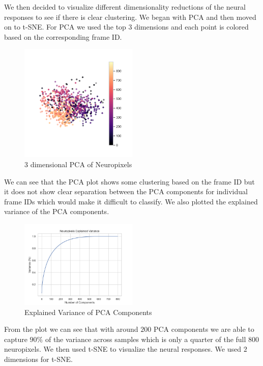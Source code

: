 \documentclass[12pt, letterpaper]{article}
\begin{document}
We then decided to visualize different dimensionality reductions of the neural responses to see if there is clear clustering. We began with PCA and then moved on to t-SNE. For PCA we used the top $3$ dimensions and each point is colored based on the corresponding frame ID. 

\begin{figure}[H]
    \centering
    \includegraphics[width=0.5\textwidth]{3d_pca_neuropixels.png}
    \caption{3 dimensional PCA of Neuropixels}
    \label{fig:3d_pca_neuropixels}
\end{figure}

We can see that the PCA plot shows some clustering based on the frame ID but it does not show clear separation between the PCA components for individual frame IDs which would make it difficult to classify. We also plotted the explained variance of the PCA components.

\begin{figure}[H]
    \centering
    \includegraphics[width=0.5\textwidth]{neuropixels_pca_explained_variance.png}
    \caption{Explained Variance of PCA Components}
    \label{fig:explained_variance_pca}
\end{figure}

From the plot we can see that with around $200$ PCA components we are able to capture $90\%$ of the variance across samples which is only a quarter of the full $800$ neuropixels. We then used t-SNE to visualize the neural responses. We used $2$ dimensions for t-SNE. 
\end{document}
